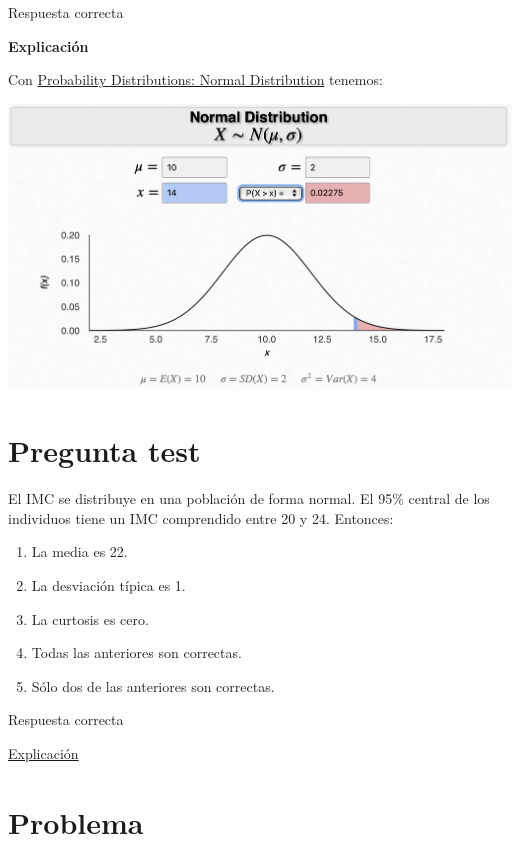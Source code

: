 \documentclass[
]{book}
\providecommand{\tightlist}{%
  \setlength{\itemsep}{0pt}\setlength{\parskip}{0pt}}
\begin{document}
Respuesta correcta

\textbf{Explicación}

Con \href{https://homepage.divms.uiowa.edu/~mbognar/applets/normal.html}{Probability Distributions: Normal Distribution} tenemos:

\includegraphics[width=20.78in]{img/3_3}

\hypertarget{pregunta-test-105}{%
\section{Pregunta test}\label{pregunta-test-105}}

El IMC se distribuye en una población de forma normal. El 95\% central de los individuos tiene un IMC comprendido entre 20 y 24. Entonces:

\begin{enumerate}
\def\labelenumi{\alph{enumi})}
\tightlist
\item
  La media es 22.
\item
  La desviación típica es 1.
\item
  La curtosis es cero.
\item
  Todas las anteriores son correctas.
\item
  Sólo dos de las anteriores son correctas.
\end{enumerate}

Respuesta correcta

\href{https://1fjmanzano.github.io/bioestadistica/distribuciones-de-probabilidad.html\#distribucio\%CC\%81n-normal}{Explicación}

\hypertarget{problema-8}{%
\section{Problema}\label{problema-8}}
\end{document}
